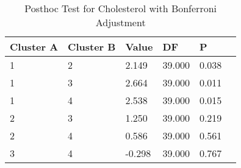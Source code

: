 \begin{table}[h]
\caption{Posthoc Test for Cholesterol with Bonferroni Adjustment}
\label{tab:posthoc_Cholesterol}
\begin{tabular}{llllll}
\toprule
Cluster A & Cluster B & Value & DF & P &   \\
\midrule
1 & 2 & 2.149 & 39.000 & 0.038 &   \\
1 & 3 & 2.664 & 39.000 & 0.011 &   \\
1 & 4 & 2.538 & 39.000 & 0.015 &   \\
2 & 3 & 1.250 & 39.000 & 0.219 &   \\
2 & 4 & 0.586 & 39.000 & 0.561 &   \\
3 & 4 & -0.298 & 39.000 & 0.767 &   \\
\bottomrule
\end{tabular}
\end{table}
